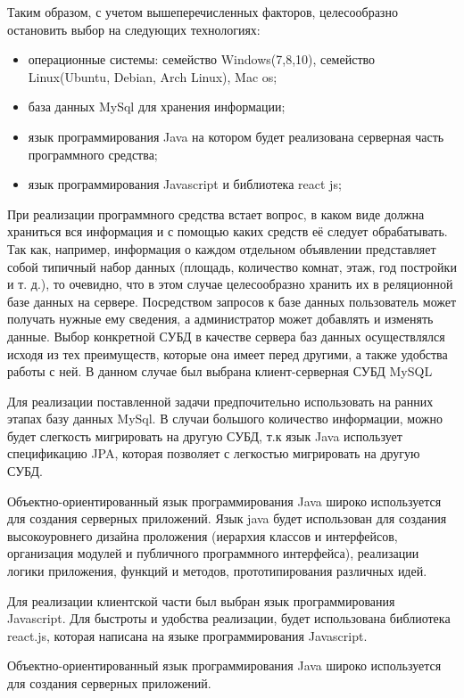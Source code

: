 Таким образом, с учетом вышеперечисленных факторов, целесообразно остановить выбор на следующих технологиях:
\begin{itemize}
  \item операционные системы: семейство Windows(7,8,10), семейство Linux(Ubuntu, Debian, Arch Linux), Mac os;
  \item база данных MySql для хранения информации;
  \item язык программирования Java на котором будет реализована серверная часть программного средства;
  \item язык программирования Javascript и библиотека react js;
\end{itemize}
При реализации программного средства встает вопрос, в каком виде должна храниться вся информация и с помощью каких средств её следует обрабатывать. Так как, например, информация о каждом отдельном объявлении представляет собой типичный набор данных (площадь, количество комнат, этаж, год постройки и т. д.), то очевидно, что в этом случае целесообразно хранить их в реляционной базе данных на сервере. Посредством запросов к базе данных пользователь может получать нужные ему сведения, а администратор может добавлять и изменять данные. Выбор конкретной СУБД в качестве сервера баз данных осуществлялся исходя из тех преимуществ, которые она имеет перед другими, а также удобства работы с ней. В данном случае был выбрана клиент-серверная СУБД MySQL

Для реализации поставленной задачи предпочительно использовать на ранних этапах базу данных MySql. В случаи большого количество информации, можно будет слегкость мигрировать на другую СУБД, т.к язык Java использует спецификацию JPA, которая позволяет с легкостью мигрировать на другую СУБД.

Объектно-ориентированный язык программирования Java широко используется для создания серверных приложений. Язык java будет использован для создания высокоуровнего дизайна проложения (иерархия классов и интерфейсов, организация модулей и публичного программного интерфейса), реализации логики приложения, функций и методов, прототипирования различных идей.

Для реализации клиентской части был выбран язык программирования Javascript. Для быстроты и удобства реализации, будет использована библиотека react.js, которая написана на языке программирования Javascript. 

Объектно-ориентированный язык программирования Java широко используется для создания серверных приложений.

